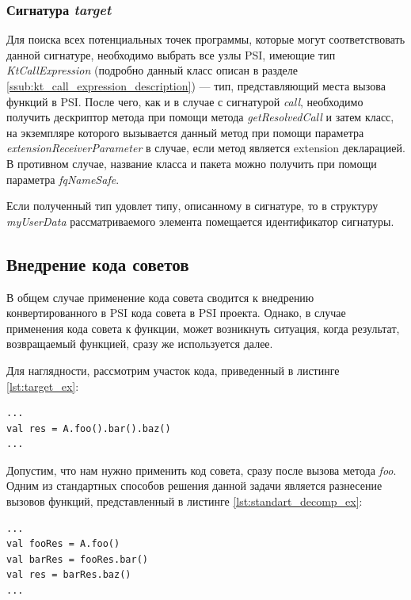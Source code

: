 \subsubsection{Сигнатура \textit{target}}
\label{ssub:target_signature}
Для поиска всех потенциальных точек программы, которые могут соответствовать
данной сигнатуре, необходимо выбрать все узлы PSI, имеющие тип
\textit{KtCallExpression} (подробно данный класс описан в разделе
\ref{ssub:kt_call_expression_description}) --- тип, представляющий места вызова
функций в PSI.
После чего, как и в случае с сигнатурой \textit{call}, необходимо получить
дескриптор метода при помощи метода \textit{getResolvedCall} и затем класс, на
экземпляре которого вызывается данный метод при помощи параметра
\textit{extensionReceiverParameter} в случае, если метод является extension
декларацией.
В противном случае, название класса и пакета можно получить при помощи параметра
\textit{fqNameSafe}.

Если полученный тип удовлет	типу, описанному в сигнатуре, то в структуру
\textit{myUserData} рассматриваемого элемента помещается идентификатор
сигнатуры.
\subsection{Внедрение кода советов}
\label{sub:advice_applying_description}
В общем случае применение кода совета сводится к внедрению конвертированного в
PSI кода совета в PSI проекта.
Однако, в случае применения кода совета к функции, может возникнуть ситуация,
когда результат, возвращаемый функцией, сразу же используется далее.

Для наглядности, рассмотрим участок кода, приведенный в листинге
\ref{lst:target_ex}:
\begin{lstlisting}[style={java}, label=lst:target_ex,
    caption={Пример целевой точки внедрения}]
...
val res = A.foo().bar().baz()
...
\end{lstlisting}
Допустим, что нам нужно применить код совета, сразу после вызова метода
\textit{foo}.
Одним из стандартных способов решения данной задачи является разнесение вызовов
функций, представленный в листинге \ref{lst:standart_decomp_ex}:
\begin{lstlisting}[style={java}, label=lst:standart_decomp_ex,
    caption={Пример разнесения вызовов методов}]
...
val fooRes = A.foo()
val barRes = fooRes.bar()
val res = barRes.baz()
...
\end{lstlisting}


